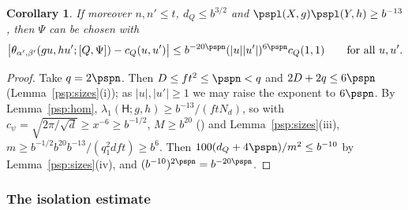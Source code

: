 \documentclass[10pt]{amsart}
\newtheorem{corollary}[theorem]{Corollary}
\theoremstyle{definition}
\theoremstyle{remark}
\begin{document}
\begin{corollary}\label{psp:sparse2}
If moreover $n,n'\le t$, $d_Q\le b^{3/2}$ and $\pspl(X,g)\pspl(Y,h)\ge b^{-13}$, then $\Psi$ can be
chosen with
\[
\bigl|\theta_{\alpha',\beta'}(gu,hu';[Q,\Psi])-c_Q(u,u')\bigr|\le b^{-20\pspn}(|u||u'|)^{6\pspn}
c_Q(1,1)\qquad\text{for all }u,u'.
\]
\end{corollary}
\begin{proof}
Take $q=2\pspn$. Then $D\le ft^2\le\pspn<q$ and $2D+2q\le6\pspn$ (Lemma~\ref{psp:sizes}(i)); as
$|u|,|u'|\ge1$ we may raise the exponent to $6\pspn$. By Lemma~\ref{psp:hom},
$\lambda_1(\mathsf H;g,h)\ge b^{-13}/(ftN_d)$, so with $c_\psi=\sqrt{2\pi/\sqrt d}\ge x^{-6}\ge
b^{-1/2}$, $M\ge b^{20}$ ({\cite[Lemma~13.4(S5)]{P46}}) and Lemma~\ref{psp:sizes}(iii),
$m\ge b^{-1/2}b^{20}b^{-13}/(q_1^2dft)\ge b^{6}$. Then $100(d_Q+4\pspn)/m^2\le b^{-10}$ by
Lemma~\ref{psp:sizes}(iv), and $(b^{-10})^{2\pspn}=b^{-20\pspn}$.
\end{proof}

\subsubsection{The isolation estimate}\label{psp:ss-isol}
\end{document}
